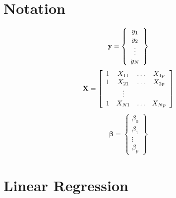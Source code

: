 \documentclass[11pt]{article}
\theoremstyle{remark}
\begin{document}
\section{Notation}
\begin{eqnarray}
\bold{y} =
\left\{
\begin{array}{c}
y_1\\
y_2\\
\vdots\\
y_N
\end{array}
\right\}
\end{eqnarray}
\begin{eqnarray}
\bold{X} =
\left[
\begin{array}{cccc}
1 & X_{11} & \hdots & X_{1p}\\
1 & X_{21} & \hdots & X_{2p}\\
  & \vdots &  & \\
1 & X_{N1} & \hdots & X_{Np}
\end{array}
\right]
\end{eqnarray}
\begin{eqnarray}
\boldsymbol{\beta} =
\left\{
\begin{array}{c}
\beta_0\\
\beta_1\\
\vdots\\
\beta_p
\end{array}
\right\}
\end{eqnarray}

\section{Linear Regression}
\end{document}
